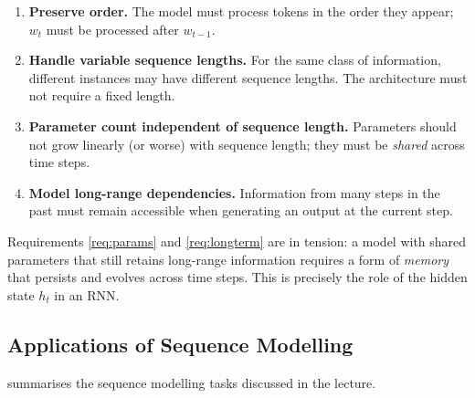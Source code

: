 \documentclass[12pt,a4paper]{article}
\begin{document}
\begin{enumerate}[label=\textbf{R\arabic*.}, leftmargin=3em]
  \item \label{req:order} \textbf{Preserve order.} The model must process
        tokens in the order they appear; $w_t$ must be processed after
        $w_{t-1}$.
  \item \label{req:varlen} \textbf{Handle variable sequence lengths.} For the
        same class of information, different instances may have different
        sequence lengths.  The architecture must not require a fixed length.
  \item \label{req:params} \textbf{Parameter count independent of sequence
        length.} Parameters should not grow linearly (or worse) with
        sequence length; they must be \emph{shared} across time steps.
  \item \label{req:longterm} \textbf{Model long-range dependencies.}
        Information from many steps in the past must remain accessible when
        generating an output at the current step.
\end{enumerate}

\begin{keyinsight}
Requirements \ref{req:params} and \ref{req:longterm} are in tension: a model
with shared parameters that still retains long-range information requires a
form of \emph{memory} that persists and evolves across time steps.  This is
precisely the role of the hidden state $h_t$ in an RNN.
\end{keyinsight}

\subsection{Applications of Sequence Modelling}
\label{subsec:applications}

 summarises the sequence modelling tasks discussed in
the lecture.
\end{document}
